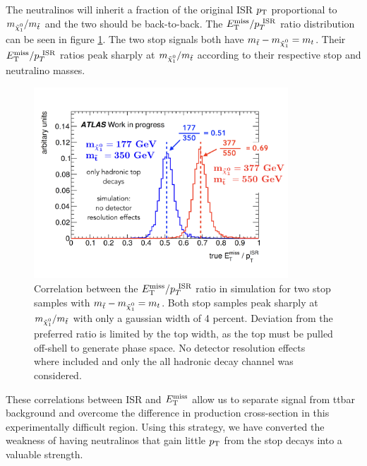\indent The neutralinos will inherit a fraction of the original ISR $p_{\mathrm{T}}$ proportional to  $m_{\ninoone}/m_{\stop}$ and the two should be back-to-back.  The $E_{\mathrm{T}}^{\mathrm{miss}}/p_{T}^{~\mathrm{ISR}}$ ratio distribution can be seen in figure \ref{fig:trueRISR}.  The two stop signals both have $m_{\stop}-m_{\ninoone} = m_t$.  Their $E_{\mathrm{T}}^{\mathrm{miss}}/p_{T}^{~\mathrm{ISR}}$ ratios peak sharply at $m_{\ninoone}/m_{\stop}$ according to their respective stop and neutralino masses.  \\

\begin{figure}[h!]
\centering
    \includegraphics[width=0.85\textwidth]{figures/strategy/RISR_truth.png}\hspace{0.05\textwidth}
\caption{ Correlation between the $E_{\mathrm{T}}^{\mathrm{miss}}/p_{T}^{~\mathrm{ISR}}$ ratio in simulation for two stop samples with $m_{\stop}-m_{\ninoone} = m_t$.  Both stop samples peak sharply at $m_{\ninoone}/m_{\stop}$ with only a gaussian width of 4 percent.  Deviation from the preferred ratio is limited by the top width, as the top must be pulled off-shell to generate phase space. No detector resolution effects where included and only the all hadronic decay channel was considered. }
\label{fig:trueRISR}
\end{figure}

\indent These correlations between ISR and $E_{\mathrm{T}}^{\mathrm{miss}}$ allow us to separate signal from ttbar background and overcome the difference in production cross-section in this experimentally difficult region.  Using this strategy, we have converted the weakness of having neutralinos that gain little $p_{\mathrm{T}}$ from the stop decays into a valuable strength. \\

